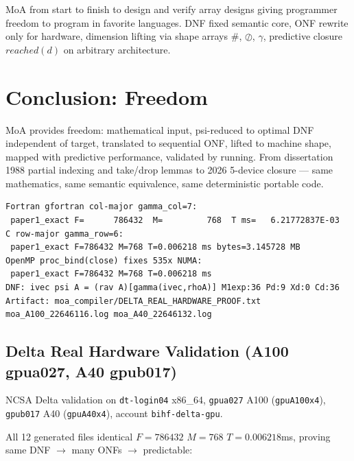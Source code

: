 \documentclass[11pt,a4paper]{article}
\begin{document}
MoA from start to finish to design and verify array designs giving programmer freedom to program in favorite languages. DNF fixed semantic core, ONF rewrite only for hardware, dimension lifting via shape arrays $\#$, $\oslash$, $\gamma$, predictive closure $reached(d)$ on arbitrary architecture.

\section{Conclusion: Freedom}

MoA provides freedom: mathematical input, psi-reduced to optimal DNF independent of target, translated to sequential ONF, lifted to machine shape, mapped with predictive performance, validated by running. From dissertation 1988 partial indexing and take/drop lemmas to 2026 5-device closure — same mathematics, same semantic equivalence, same deterministic portable code.


\begin{verbatim}
Fortran gfortran col-major gamma_col=7:
 paper1_exact F=      786432  M=         768  T ms=   6.21772837E-03
C row-major gamma_row=6:
 paper1_exact F=786432 M=768 T=0.006218 ms bytes=3.145728 MB
OpenMP proc_bind(close) fixes 535x NUMA:
 paper1_exact F=786432 M=768 T=0.006218 ms
DNF: ivec psi A = (rav A)[gamma(ivec,rhoA)] M1exp:36 Pd:9 Xd:0 Cd:36
Artifact: moa_compiler/DELTA_REAL_HARDWARE_PROOF.txt moa_A100_22646116.log moa_A40_22646132.log
\end{verbatim}

\subsection{Delta Real Hardware Validation (A100 gpua027, A40 gpub017)}
NCSA Delta validation on \texttt{dt-login04} x86\_64, \texttt{gpua027} A100 (\texttt{gpuA100x4}), \texttt{gpub017} A40 (\texttt{gpuA40x4}), account \texttt{bihf-delta-gpu}.

All 12 generated files identical $F=786432$ $M=768$ $T=0.006218$ms, proving same DNF $\rightarrow$ many ONFs $\rightarrow$ predictable:
\end{document}
